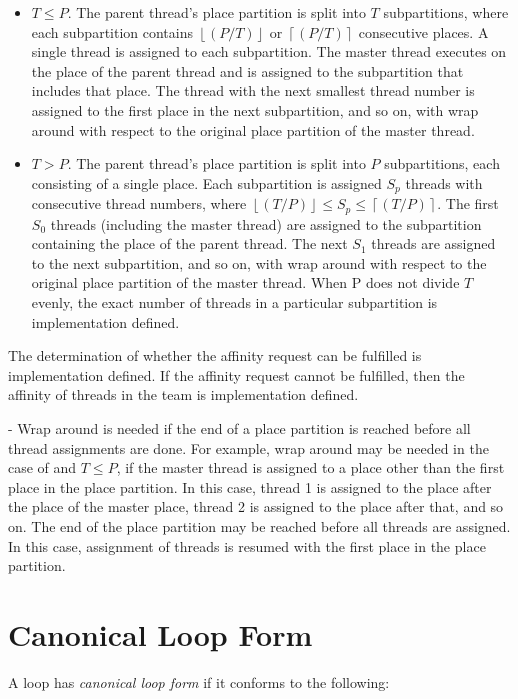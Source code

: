 \begin{itemize}
\item $T\leq P$. The parent thread's place partition is split into $T$ subpartitions, where each subpartition 
contains $\left \lfloor{(P/T)}\right \rfloor$ or $\left \lceil{(P/T)}\right \rceil$ consecutive places. A single thread is assigned to each subpartition. The master thread executes on the place of the parent thread and is assigned to the subpartition that includes that place. The thread with the next smallest thread number is assigned to the first place in the next subpartition, and so on, with wrap around with respect to the original place partition of the master thread.

\item $T>P$. The parent thread's place partition is split into $P$ subpartitions, each consisting of a single place. Each subpartition is assigned $S_{p}$ threads with consecutive thread numbers, where $\left \lfloor{(T/P)}\right \rfloor\leq S_{p} \leq \left \lceil{(T/P)}\right \rceil$. The first $S_{0}$ threads (including the master thread) are assigned to the subpartition containing the place of the parent thread. The next $S_{1}$ threads are assigned to the next subpartition, and so on, with wrap around with respect to the original place partition of the master thread. When P does not divide $T$ evenly, the exact number of threads in a particular subpartition is implementation defined. 
\end{itemize}

The determination of whether the affinity request can be fulfilled is implementation defined. If the affinity request cannot be fulfilled, then the affinity of threads in the team is implementation defined.

\notestart
\noteheader - Wrap around is needed if the end of a place partition is reached before all thread assignments are done. For example, wrap around may be needed in the case of  and $T\leq P$, if the master thread is assigned to a place other than the first place in the place partition. In this case, thread 1 is assigned to the place after the place of the master place, thread 2 is assigned to the place after that, and so on. The end of the place partition may be reached before all threads are assigned. In this case, assignment of threads is resumed with the first place in the place partition.
\noteend


\pagebreak
\section{Canonical Loop Form}
\label{sec:Canonical Loop Form}
\ccppspecificstart
A loop has \emph{canonical loop form} if it conforms to the following:

